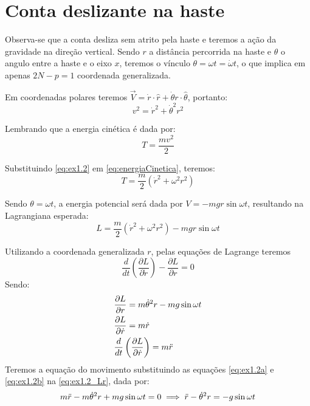 \section{Conta deslizante na haste}
    
Observa-se que a conta desliza sem atrito pela haste e teremos a ação da gravidade na direção vertical. Sendo $r$ a distância percorrida na haste e $\theta$ o angulo entre a haste e o eixo $x$, teremos o vínculo $\theta=\omega t=\dot{\omega}t$, o que implica em apenas $2N-p=1$ coordenada generalizada.
    
Em coordenadas polares teremos $\Vec{V}=\dot{r}\cdot \hat{r} + \dot{\theta} r \cdot \hat{\theta}$, portanto:
\begin{equation}\label{eq:ex1.2}
    v^2=\dot{r}^2+\dot{\theta}^2r^2    
\end{equation}

Lembrando que a energia cinética é dada por:
\begin{equation}\label{eq:energiaCinetica}
    T = \frac{m v^2}{2}
\end{equation}

Substituindo \eqref{eq:ex1.2} em \eqref{eq:energiaCinetica}, teremos:
\begin{equation} \nonumber
    T = \frac{m}{2} \left ( \dot{r}^2+\omega^2r^2 \right )
\end{equation}

Sendo $\theta = \omega t$, a energia potencial será dada por $V=-mgr \sin{\omega t}$, resultando na Lagrangiana esperada:
\begin{equation} \nonumber
    L = \frac{m}{2} \left ( \dot{r}^2+\omega^2r^2 \right ) - mgr \sin{\omega t}
\end{equation}

Utilizando a coordenada generalizada $r$, pelas equações de Lagrange teremos
\begin{equation} \label{eq:ex1.2_Lr}
    \frac{d}{dt}\left ( \frac{\partial L}{\partial \dot{r}} \right )  - \frac{\partial L}{\partial r} = 0
\end{equation}
 Sendo:
\begin{align}
    & \frac{\partial L}{\partial r} = m\dot{\theta}^2r - mg \sin{\omega t} \label{eq:ex1.2a}\\
    & \frac{\partial L}{\partial \dot{r}} = m \dot{r} \\
    & \frac{d}{dt}\left ( \frac{\partial L}{\partial \dot{r}} \right ) =  m \Ddot{r} \label{eq:ex1.2b}
\end{align}
Teremos a equação do movimento substituindo as equações \eqref{eq:ex1.2a} e \eqref{eq:ex1.2b} na \eqref{eq:ex1.2_Lr}, dada por:
\begin{equation}
    m \Ddot{r} - m\dot{\theta}^2r + mg \sin{\omega t} = 0 \implies \Ddot{r} - \dot{\theta}^2r = -g \sin{\omega t} \label{eq:ex1.2_eq_movimento}
\end{equation}


